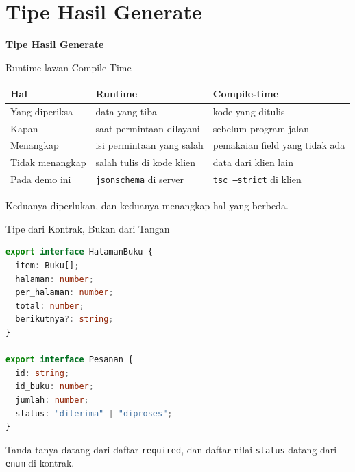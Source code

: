 \documentclass[aspectratio=169, table, 12pt]{beamer}
\begin{document}
\section{Tipe Hasil Generate}

\begin{frame}{\hfill}
  \centering
  \Huge{\textbf{Tipe Hasil Generate}}
\end{frame}

\begin{frame}{{\Large Runtime lawan Compile-Time}}
  \vspace{6pt}
  \centering
  {\footnotesize
  \begin{tabularx}{\textwidth}{lYY}
    \hline
    \textbf{Hal} & \textbf{Runtime} & \textbf{Compile-time} \\
    \hline
    Yang diperiksa & data yang tiba & kode yang ditulis \\
    \hline
    Kapan & saat permintaan dilayani & sebelum program jalan \\
    \hline
    Menangkap & isi permintaan yang salah & pemakaian field yang tidak ada \\
    \hline
    Tidak menangkap & salah tulis di kode klien & data dari klien lain \\
    \hline
    Pada demo ini & \texttt{jsonschema} di server & \texttt{tsc --strict} di klien \\
    \hline
  \end{tabularx}}

  \vspace{6pt}
  {\small Keduanya diperlukan, dan keduanya menangkap hal yang berbeda.}
\end{frame}

\begin{frame}[fragile]{{\Large Tipe dari Kontrak, Bukan dari Tangan}}
  \vspace{2pt}
\begin{lstlisting}[language=TypeScript]
export interface HalamanBuku {
  item: Buku[];
  halaman: number;
  per_halaman: number;
  total: number;
  berikutnya?: string;
}

export interface Pesanan {
  id: string;
  id_buku: number;
  jumlah: number;
  status: "diterima" | "diproses";
}
\end{lstlisting}
  \vspace{2pt}
  {\small Tanda tanya datang dari daftar \texttt{required}, dan daftar nilai
  \texttt{status} datang dari \texttt{enum} di kontrak.}
\end{frame}
\end{document}
